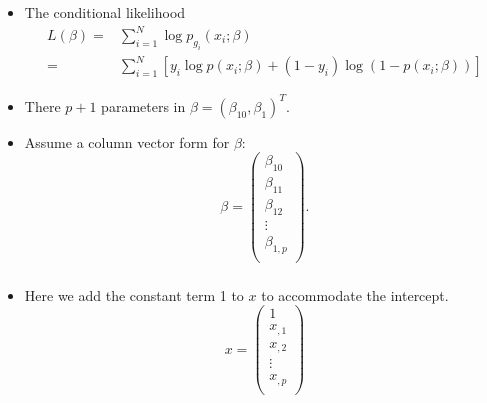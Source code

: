 \documentclass[12pt,notes,mathserif]{beamer}
\begin{document}
\begin{frame}[c]
	\frametitle{}
	\begin{itemize}
		\item
		      The conditional likelihood
		      \begin{align*}
			      L(\beta ) = & \sum\limits_{i=1}^{N}
			      \log p_{g_i} (x_i ;\beta )          \\
			      =           & \sum\limits_{i=1}^{N}
			      [y_i \log p(x_i ;\beta ) + (1 − y_i )\log(1 − p(x_i ;\beta ))]
		      \end{align*}
		\item  There $p + 1$ parameters in $\beta = (\beta_{10},\beta_{1})^T$.
		\item Assume a column vector form for $\beta$:
		      \begin{equation*}
			      \beta=
			      \begin{pmatrix}
				      \beta_{10}  \\
				      \beta_{11}  \\
				      \beta_{12}  \\
				      \vdots      \\
				      \beta_{1,p} \\
			      \end{pmatrix}.
		      \end{equation*}
	\end{itemize}
\end{frame}

\begin{frame}[c]
	\frametitle{}
	\begin{itemize}
		\item
		      Here we add the constant term 1 to $x$ to accommodate the intercept.
		      \begin{equation*}
			      x=
			      \begin{pmatrix}
				      1      \\
				      x_{,1} \\
				      x_{,2} \\
				      \vdots \\
				      x_{,p} \\
			      \end{pmatrix}
		      \end{equation*}
	\end{itemize}
\end{frame}
\end{document}

